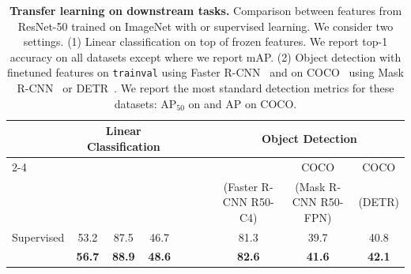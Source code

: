 \begin{table}[h]
\centering
    \caption{
\textbf{Transfer learning on downstream tasks.}
Comparison between features from ResNet-50 trained on ImageNet with \OURS or supervised learning.
We consider two settings.
(1) Linear classification on top of frozen features. We report top-1 accuracy on all datasets except \VOCseven where we report mAP.
	(2) Object detection with finetuned features on \VOCseventwelve \texttt{trainval} using Faster R-CNN~\cite{ren2015faster} and on COCO~\cite{lin2014microsoft} using Mask R-CNN~\cite{he2017mask} or DETR~\cite{carion2020end}.
We report the most standard detection metrics for these datasets: $\text{AP}_{50}$ on \VOCseventwelve and $\text{AP}$ on COCO.
    }
    \label{fig:frozen_and_detect}
    \vspace{.4em}
  \setlength{\tabcolsep}{3.7pt}
    \begin{tabular}{ @{} l ccc c ccc @{} }
      \toprule
       & \multicolumn{3}{c}{Linear Classification} &~~~~& \multicolumn{3}{c}{Object Detection}\\
\cmidrule{2-4}\cmidrule{6-8}
	    &\Places & \VOCseven & \iNat && \VOCseventwelve & COCO & COCO \\
	    & &  &  && \scriptsize(Faster R-CNN R50-C4) & \scriptsize(Mask R-CNN R50-FPN) & \scriptsize(DETR) \\
      \midrule
	    Supervised & 53.2  & 87.5 & 46.7 && 81.3 & 39.7 & 40.8 \\
      \midrule
	    \OURS  & \bf 56.7 & \bf 88.9 & \bf 48.6 && \bf 82.6 & \bf 41.6 & \bf 42.1 \\
      \bottomrule
    \end{tabular}
\end{table}

